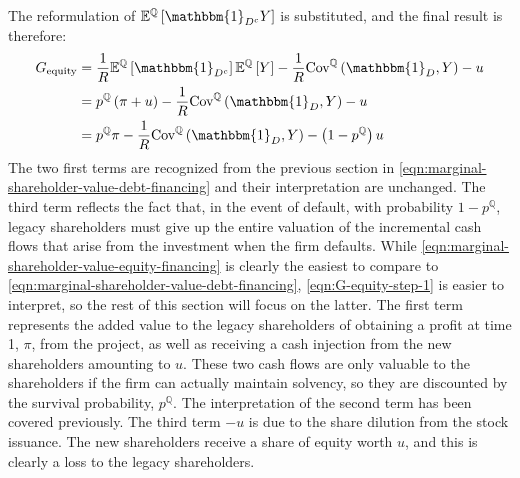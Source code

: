 \documentclass[../main.tex]{subfiles}
\begin{document}
        The reformulation of $\mathbb{E}^{\mathbb{Q}}\left[\mathbbm{1}_{D^{c}} Y\right]$ is substituted, 
        and the final result is therefore:
            \begin{align}
                G_{\text{equity}} &=
                    \discountfactor
                    \mathbb{E}^{\mathbb{Q}}\left[\mathbbm{1}_{D^{c}}\right]
                    \mathbb{E}^{\mathbb{Q}}\left[Y\right]
                    -
                    \discountfactor
                    \text{Cov}^{\mathbb{Q}}\left(
                        \mathbbm{1}_{D},
                        Y
                    \right)
                    -
                    u
                    \nonumber \\
                &= 
                    p^{\mathbb{Q}}
                    \left(
                        \pi
                        +
                        u
                    \right)
                    -
                    \discountfactor
                    \text{Cov}^{\mathbb{Q}}\left(
                        \mathbbm{1}_{D},
                        Y
                    \right)
                    -
                    u 
                    \label{eqn:G-equity-step-1} \\
                &= 
                    p^{\mathbb{Q}}
                    \pi
                    -
                    \discountfactor
                    \text{Cov}^{\mathbb{Q}}\left(
                        \mathbbm{1}_{D},
                        Y
                    \right)
                    -
                    \left(
                        1
                        -
                        p^{\mathbb{Q}}
                    \right)
                    u 
                \label{eqn:marginal-shareholder-value-equity-financing}
            \end{align}
        The two first terms are recognized from the previous section in 
        \cref{eqn:marginal-shareholder-value-debt-financing}
        and their interpretation are unchanged. 
        The third term reflects the fact that, in the event of default, with probability $1-p^{\mathbb{Q}}$, 
        legacy shareholders must give up the entire valuation of the incremental cash flows
        that arise from the investment when the firm defaults.
        While \cref{eqn:marginal-shareholder-value-equity-financing} is clearly the easiest to compare to 
        \cref{eqn:marginal-shareholder-value-debt-financing},
        \cref{eqn:G-equity-step-1} is easier to interpret, so the rest of this section will focus on the latter.
        The first term represents the added value to the legacy shareholders of 
        obtaining a profit at time 1, $\pi$, from the project,
        as well as receiving a cash injection from the new shareholders amounting to $u$.
        These two cash flows are only valuable to the shareholders if the firm can actually maintain solvency,
        so they are discounted by the survival probability, $p^{\mathbb{Q}}$.
        The interpretation of the second term has been covered previously.
        The third term $-u$ is due to the share dilution from the stock issuance.
        The new shareholders receive a share of equity worth $u$, 
        and this is clearly a loss to the legacy shareholders.
\end{document}
